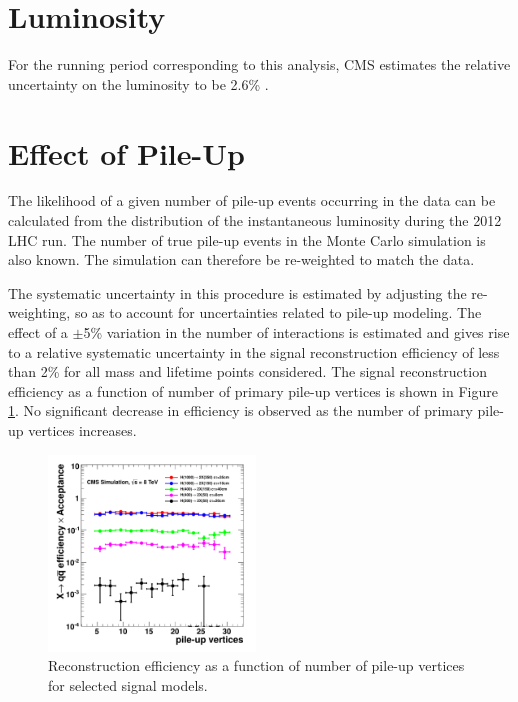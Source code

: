 \section{Luminosity}
For the running period corresponding to this analysis, CMS estimates the relative uncertainty on the luminosity to be 2.6\% \cite{CMS-PAS-LUM-13-001}.

\section{Effect of Pile-Up}
The likelihood of a given number of pile-up events occurring in the data can be calculated from the distribution
 of the instantaneous luminosity during the 2012 LHC run. The number of true pile-up events in the Monte Carlo
 simulation is also known. The simulation can therefore be re-weighted to match the data. 

The systematic uncertainty in this procedure is estimated by adjusting the re-weighting, so as to account
 for uncertainties related to pile-up modeling. 
The effect of a $\pm$5\% variation in the number of interactions is estimated and gives rise 
to a relative systematic uncertainty in the signal reconstruction efficiency 
of less than 2\% for all mass and lifetime points considered. The signal reconstruction efficiency as
a function of number of primary pile-up vertices is shown in Figure \ref{fig:effPU}. No significant
decrease in efficiency is observed as the number of primary pile-up vertices increases.

\begin{figure}[htbp]
\centering
\includegraphics[width=0.49\textwidth]{plots/signal/effPU.pdf}
\caption{Reconstruction efficiency as a function of number of pile-up vertices for selected
signal models.\label{fig:effPU}}
\end{figure}

